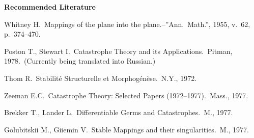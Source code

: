 \documentclass[12pt]{amsart}
\begin{document}
\noindent\textbf{Recommended Literature}

\noindent Whitney H.~Mappings of the plane into the plane.--''Ann.~Math.'',
1955, v.~62, p.~374--470.

\noindent Poston T., Stewart I.~Catastrophe Theory and its
Applications.~Pitman, 1978.~(Currently being translated into Russian.)

\noindent Thom R.~Stabilité Structurelle et Morphogénèse.~N.Y., 1972.

\noindent Zeeman E.C.~Catastrophe Theory: Selected Papers
(1972--1977).~Mass., 1977.

\noindent Brekker T., Lander L.~Differentiable Germs and Catastrophes.~M.,
1977.

\noindent Golubitskii M., Giiemin V.~Stable Mappings and their
singularities.~M., 1977.
\end{document}
